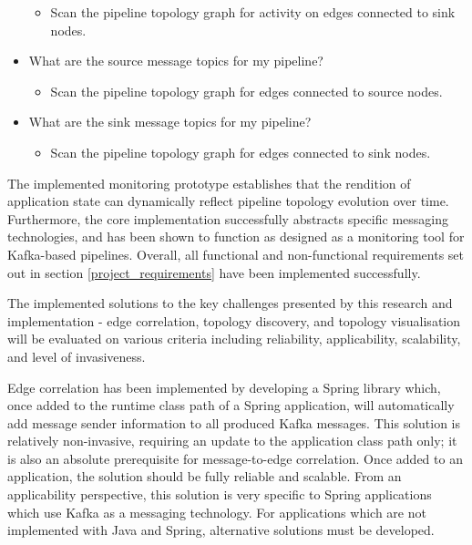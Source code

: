 \begin{itemize}
    		\begin{itemize}
    			\item Scan the pipeline topology graph for activity on edges connected to sink nodes.
    		\end{itemize}
    \item What are the source message topics for my pipeline?
    		\begin{itemize}
				\item Scan the pipeline topology graph for edges connected to source nodes.
			\end{itemize}
    \item What are the sink message topics for my pipeline?
    	\begin{itemize}
    		\item Scan the pipeline topology graph for edges connected to sink nodes.
    	\end{itemize}
\end{itemize}

The implemented monitoring prototype establishes that the rendition of application state can dynamically reflect pipeline topology evolution over time. Furthermore, the core implementation successfully abstracts specific messaging technologies, and has been shown to function as designed as a monitoring tool for Kafka-based pipelines. Overall, all functional and non-functional requirements set out in section \ref{project_requirements} have been implemented successfully.

The implemented solutions to the key challenges presented by this research and implementation - edge correlation, topology discovery, and topology visualisation will be evaluated on various criteria including reliability, applicability, scalability, and level of invasiveness. 

Edge correlation has been implemented by developing a Spring library which, once added to the runtime class path of a Spring application, will automatically add message sender information to all produced Kafka messages. This solution is relatively non-invasive, requiring an update to the application class path only; it is also an absolute prerequisite for message-to-edge correlation. Once added to an application, the solution should be fully reliable and scalable. From an applicability perspective, this solution is very specific to Spring applications which use Kafka as a messaging technology. For applications which are not implemented with Java and Spring, alternative solutions must be developed. 

